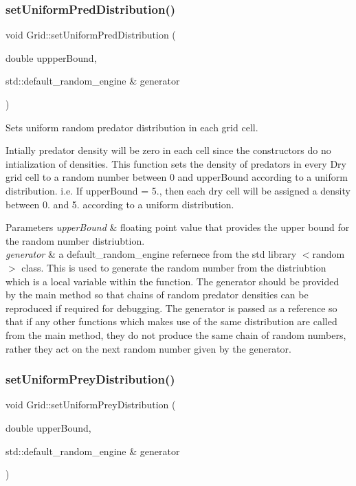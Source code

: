 \subsubsection{\texorpdfstring{set\+Uniform\+Pred\+Distribution()}{setUniformPredDistribution()}}
{\footnotesize\ttfamily void Grid\+::set\+Uniform\+Pred\+Distribution (\begin{DoxyParamCaption}\item[{double}]{uppper\+Bound,  }\item[{std\+::default\+\_\+random\+\_\+engine \&}]{generator }\end{DoxyParamCaption})}

Sets uniform random predator distribution in each grid cell.

Intially predator density will be zero in each cell since the constructors do no intialization of densities. This function sets the density of predators in every Dry grid cell to a random number between 0 and upper\+Bound according to a uniform distribution. i.\+e. If upper\+Bound = 5., then each dry cell will be assigned a density between 0. and 5. according to a uniform distribution.


\begin{DoxyParams}{Parameters}
{\em upper\+Bound} & floating point value that provides the upper bound for the random number distriubtion.\\
\hline
{\em generator} & a default\+\_\+random\+\_\+engine refernece from the std library $<$random$>$ class. This is used to generate the random number from the distriubtion which is a local variable within the function. The generator should be provided by the main method so that chains of random predator densities can be reproduced if required for debugging. The generator is passed as a reference so that if any other functions which makes use of the same distribution are called from the main method, they do not produce the same chain of random numbers, rather they act on the next random number given by the generator. \\
\hline
\end{DoxyParams}
\mbox{\label{class_grid_a2f366ddaaa75475a9597f9a85ab24d59}} 
\subsubsection{\texorpdfstring{set\+Uniform\+Prey\+Distribution()}{setUniformPreyDistribution()}}
{\footnotesize\ttfamily void Grid\+::set\+Uniform\+Prey\+Distribution (\begin{DoxyParamCaption}\item[{double}]{upper\+Bound,  }\item[{std\+::default\+\_\+random\+\_\+engine \&}]{generator }\end{DoxyParamCaption})}

